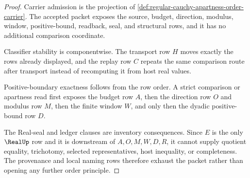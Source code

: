 \begin{proof}
Carrier admission is the projection of \autoref{def:regular-cauchy-apartness-order-carrier}. The accepted packet exposes the source, budget, direction, modulus, window, positive-bound, readback, seal, and structural rows, and it has no additional comparison coordinate.

Classifier stability is componentwise. The transport row $H$ moves exactly the rows already displayed, and the replay row $C$ repeats the same comparison route after transport instead of recomputing it from host real values.

Positive-boundary exactness follows from the row order. A strict comparison or apartness read first exposes the budget row $A$, then the direction row $O$ and modulus row $M$, then the finite window $W$, and only then the dyadic positive-bound row $D$.

The Real-seal and ledger clauses are inventory consequences. Since $E$ is the only $\RealUp$ row and it is downstream of $A,O,M,W,D,R$, it cannot supply quotient equality, trichotomy, selected representatives, host inequality, or completeness. The provenance and local naming rows therefore exhaust the packet rather than opening any further order principle.
\end{proof}

